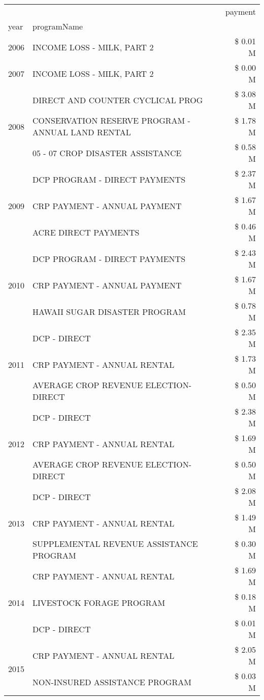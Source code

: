 \begin{tabular}{llr}
\toprule
 &  & payment \\
year & programName &  \\
\midrule
2006 & INCOME LOSS - MILK, PART 2 & \$ 0.01 M \\
\cline{1-3}
2007 & INCOME LOSS - MILK, PART 2 & \$ 0.00 M \\
\cline{1-3}
\multirow[t]{3}{*}{2008} & DIRECT AND COUNTER CYCLICAL PROG & \$ 3.08 M \\
 & CONSERVATION RESERVE PROGRAM - ANNUAL LAND RENTAL & \$ 1.78 M \\
 & 05 - 07 CROP DISASTER ASSISTANCE & \$ 0.58 M \\
\cline{1-3}
\multirow[t]{3}{*}{2009} & DCP PROGRAM - DIRECT PAYMENTS & \$ 2.37 M \\
 & CRP PAYMENT - ANNUAL PAYMENT & \$ 1.67 M \\
 & ACRE DIRECT PAYMENTS & \$ 0.46 M \\
\cline{1-3}
\multirow[t]{3}{*}{2010} & DCP PROGRAM - DIRECT PAYMENTS & \$ 2.43 M \\
 & CRP PAYMENT - ANNUAL PAYMENT & \$ 1.67 M \\
 & HAWAII SUGAR DISASTER PROGRAM & \$ 0.78 M \\
\cline{1-3}
\multirow[t]{3}{*}{2011} & DCP - DIRECT & \$ 2.35 M \\
 & CRP PAYMENT - ANNUAL RENTAL & \$ 1.73 M \\
 & AVERAGE CROP REVENUE ELECTION-DIRECT & \$ 0.50 M \\
\cline{1-3}
\multirow[t]{3}{*}{2012} & DCP - DIRECT & \$ 2.38 M \\
 & CRP PAYMENT - ANNUAL RENTAL & \$ 1.69 M \\
 & AVERAGE CROP REVENUE ELECTION-DIRECT & \$ 0.50 M \\
\cline{1-3}
\multirow[t]{3}{*}{2013} & DCP - DIRECT & \$ 2.08 M \\
 & CRP PAYMENT - ANNUAL RENTAL & \$ 1.49 M \\
 & SUPPLEMENTAL REVENUE ASSISTANCE PROGRAM & \$ 0.30 M \\
\cline{1-3}
\multirow[t]{3}{*}{2014} & CRP PAYMENT - ANNUAL RENTAL & \$ 1.69 M \\
 & LIVESTOCK FORAGE PROGRAM & \$ 0.18 M \\
 & DCP - DIRECT & \$ 0.01 M \\
\cline{1-3}
\multirow[t]{3}{*}{2015} & CRP PAYMENT - ANNUAL RENTAL & \$ 2.05 M \\
 & NON-INSURED ASSISTANCE PROGRAM & \$ 0.03 M \\

\end{tabular}
